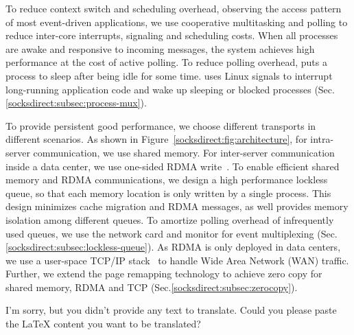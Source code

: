 To reduce context switch and scheduling overhead, observing the access pattern of most event-driven applications, we use cooperative multitasking and polling to reduce inter-core interrupts, signaling and scheduling costs. When all processes are awake and responsive to incoming messages, the system achieves high performance at the cost of active polling. To reduce polling overhead, \sys puts a process to sleep after being idle for some time. \sys uses Linux signals to interrupt long-running application code and wake up sleeping or blocked processes (Sec.\ref{socksdirect:subsec:process-mux}). 

 To provide persistent good performance, we choose different transports in different scenarios. As shown in Figure~\ref{socksdirect:fig:architecture}, for intra-server communication, we use shared memory. For inter-server communication inside a data center, we use one-sided RDMA write~\cite{mitchell2013using,kaminsky2016design}. To enable efficient shared memory and RDMA communications, we design a high performance lockless queue, so that each memory location is only written by a single process. This design minimizes cache migration and RDMA messages, as well provides memory isolation among different queues. To amortize polling overhead of infrequently used queues, we use the network card and monitor for event multiplexing (Sec.\ref{socksdirect:subsec:lockless-queue}). As RDMA is only deployed in data centers, we use a user-space TCP/IP stack~\cite{dunkels2001design} to handle Wide Area Network (WAN) traffic. Further, we extend the page remapping technology to achieve zero copy for shared memory, RDMA and TCP (Sec.\ref{socksdirect:subsec:zerocopy}).

I'm sorry, but you didn't provide any text to translate. Could you please paste the LaTeX content you want to be translated?
